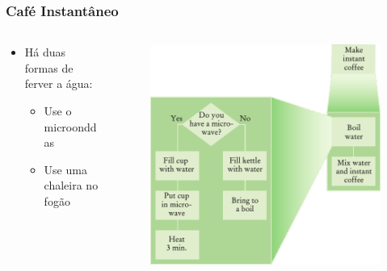 \documentclass[xcolor={dvipsnames,table},aspectratio=169]{beamer}
\begin{document}
\begin{frame}\frametitle{Café Instantâneo}
\begin{columns}[T]
	\begin{column}{0.3\linewidth}
		\begin{itemize}
		\item Há duas formas de ferver a água:
		\begin{itemize}
			\item Use o microonddas
			\item Use uma chaleira no fogão
		\end{itemize}
		\end{itemize}
	\end{column}
	\begin{column}{0.7\linewidth}\begin{figure}[h]
	\includegraphics[height=0.65\paperheight,center]{pucrs-ep-fprog-unidade_05-metodos-laminas-get_coffe_2.png}
\end{figure}
	\end{column}
\end{columns}
\end{frame}
\end{document}
